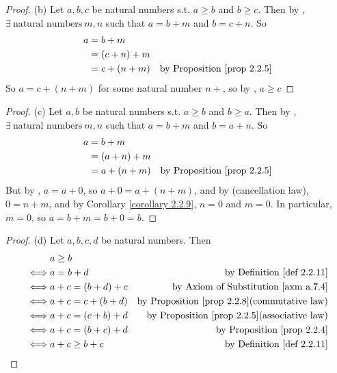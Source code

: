 \begin{proof}{(b)}
Let \(a, b, c\) be natural numbers s.t. \(a \geq b\) and \(b \geq c\). Then by , \(\exists\ \text{natural numbers}\ m, n\) such that \(a = b + m\) and \(b = c + n\). So
\begin{align*}
    a & = b + m & \\
      & = (c + n) + m & \\
      & = c + (n + m) & \text{by \PROP{2.2.5}}\\
\end{align*}
So \(a = c + (n + m)\) for some natural number \(n + \), so by , \(a \geq c\)
\end{proof}
\begin{proof}{(c)}
Let \(a, b\) be natural numbers s.t. \(a \geq b\) and \(b \geq a\). Then by , \(\exists\ \text{natural numbers}\ m, n\) such that \(a = b + m\) and \(b = a + n\). So
\begin{align*}
    a & = b + m & \\
      & = (a + n) + m & \\
      & = a + (n + m) & \text{by \PROP{2.2.5}}\\
\end{align*}
But by , \(a = a + 0\), so \(a + 0 = a + (n + m)\), and by  (cancellation law), \(0 = n + m\), and by Corollary \ref{corollary 2.2.9}, \(n = 0\) and \(m = 0\). In particular, \(m = 0\), so \(a = b + m = b + 0 = b\).
\end{proof}
\begin{proof}{(d)}
Let \(a, b, c, d\) be natural numbers. Then
\begin{align*}
         & a \geq b \\
    \iff & a = b + d             & \text{by \DEF{2.2.11}} \\
    \iff & a + c = (b + d) + c   & \text{by Axiom of Substitution \ref{axm a.7.4}} \\ 
    \iff & a + c = c + (b + d)   & \text{by \PROP{2.2.8}(commutative law)} \\
    \iff & a + c = (c + b) + d   & \text{by \PROP{2.2.5}(associative law)} \\
    \iff & a + c = (b + c) + d   & \text{by \PROP{2.2.4}} \\
    \iff & a + c \geq b + c      & \text{by \DEF{2.2.11}}
\end{align*}
\end{proof}
